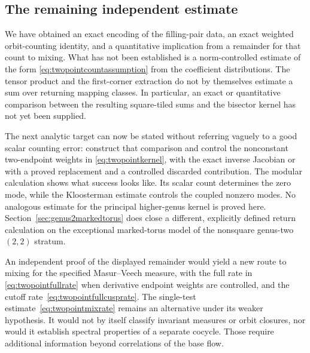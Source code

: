 \subsection*{The remaining independent estimate}

We have obtained an exact encoding of the filling-pair data, an exact
weighted orbit-counting identity, and a quantitative implication from
a remainder for that count to mixing.  What has not been established
is a norm-controlled estimate of the form
\eqref{eq:twopointcountassumption} from the coefficient distributions.
The tensor product and the first-corner extraction do not by themselves
estimate a sum over returning mapping classes.
In particular, an exact or quantitative comparison between the resulting
square-tiled sums and the bisector kernel has not yet been supplied.

The next analytic target can now be stated without referring vaguely
to a good scalar counting error: construct that comparison and control
the nonconstant two-endpoint weights in \eqref{eq:twopointkernel}, with the exact inverse Jacobian
or with a proved replacement and a controlled discarded contribution.
The modular calculation shows what success looks like.  Its scalar
count determines the zero mode, while the Kloosterman estimate controls
the coupled nonzero modes. No analogous estimate for the principal
higher-genus kernel is proved here. Section~\ref{sec:genus2markedtorus}
does close a different, explicitly defined return calculation on the
exceptional marked-torus model of the nonsquare genus-two $(2,2)$ stratum.

An independent proof of the displayed remainder would yield a new
route to mixing for the specified Masur--Veech measure, with the full rate
in \eqref{eq:twopointfullrate} when derivative endpoint weights are
controlled, and the cutoff rate~\eqref{eq:twopointfullcusprate}.
The single-test estimate~\eqref{eq:twopointmixrate} remains an
alternative under its weaker hypothesis.  It would not by itself classify invariant
measures or orbit closures, nor would it establish spectral properties
of a separate cocycle.  Those require additional information beyond
correlations of the base flow.


